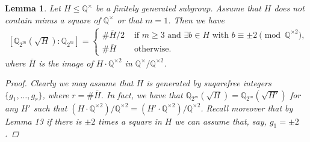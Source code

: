 \documentclass[10pt,a4paper]{article}
\author{Sebastiano Tronto}
\newtheorem{lemma}{Lemma}
\theoremstyle{definition}
\begin{document}
\begin{lemma}
\label{lemma_zero}
Let $H\leq \mathbb{Q}^\times$ be a finitely generated subgroup. Assume that $H$ does not contain minus a square of $\mathbb{Q}^\times$ or that $m=1$. Then we have
\begin{align*}
\left[\mathbb{Q}_{2^m}\left(\sqrt{H}\right):\mathbb{Q}_{2^m}\right]=\begin{cases}
\#\overline H/2 & \text{ if }m\geq 3\text{ and }\exists b\in H\text{ with }b\equiv\pm2\pmod{\mathbb{Q}^{\times 2}},\\
\#\overline H&\text{ otherwise}.
\end{cases}
\end{align*}
where $\overline{H}$ is the image of $H\cdot \mathbb{Q}^{\times 2}$ in $\mathbb{Q}^\times/\mathbb{Q}^{\times 2}$.
\begin{proof}
Clearly we may assume that $H$ is generated by suqarefree integers $\{g_1,\dots, g_r\}$, where $r=\#\overline H$. In fact, we have that $\mathbb{Q}_{2^m}(\sqrt{H})=\mathbb{Q}_{2^m}(\sqrt{H'})$ for any $H'$ such that $(H\cdot \mathbb{Q}^{\times 2})/\mathbb{Q}^{\times 2}=(H'\cdot \mathbb{Q}^{\times 2})/\mathbb{Q}^{\times 2}$. Recall moreover that by {\color{red}Lemma 13} if there is $\pm2$ times a square in $H$ we can assume that, say, $g_1=\pm 2$.


\end{proof}
\end{lemma}
\end{document}
